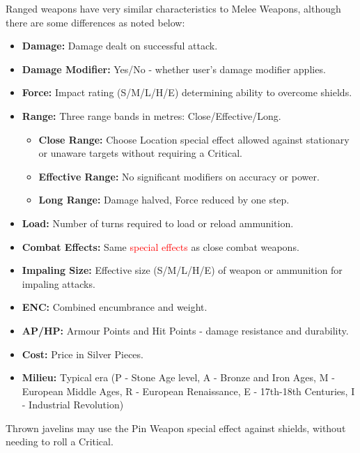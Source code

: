 \documentclass[10pt]{article}
\begin{document}
Ranged weapons have very similar characteristics to Melee Weapons, although there are some differences as noted below:

\begin{itemize}
    \item \textbf{Damage:} Damage dealt on successful attack.
    \item \textbf{Damage Modifier:} Yes/No - whether user's damage modifier applies.
    \item \textbf{Force:} Impact rating (S/M/L/H/E) determining ability to overcome shields.
    \item \textbf{Range:} Three range bands in metres: Close/Effective/Long.
    \begin{itemize}
        \item \textbf{Close Range:} Choose Location special effect allowed against stationary or unaware targets without requiring a Critical.
        \item \textbf{Effective Range:} No significant modifiers on accuracy or power.
        \item \textbf{Long Range:} Damage halved, Force reduced by one step.
    \end{itemize}
    \item \textbf{Load:} Number of turns required to load or reload ammunition.
    \item \textbf{Combat Effects:} Same \textcolor{red}{special effects} as close combat weapons.
    \item \textbf{Impaling Size:} Effective size (S/M/L/H/E) of weapon or ammunition for impaling attacks.
    \item \textbf{ENC:} Combined encumbrance and weight.
    \item \textbf{AP/HP:} Armour Points and Hit Points - damage resistance and durability.
    \item \textbf{Cost:} Price in Silver Pieces.
    \item \textbf{Milieu:} Typical era (P - Stone Age level, A - Bronze and Iron Ages, M - European Middle Ages, R - European Renaissance, E - 17th-18th Centuries, I - Industrial Revolution)
\end{itemize}

Thrown javelins may use the Pin Weapon special effect against shields, without needing to roll a Critical.
\end{document}
